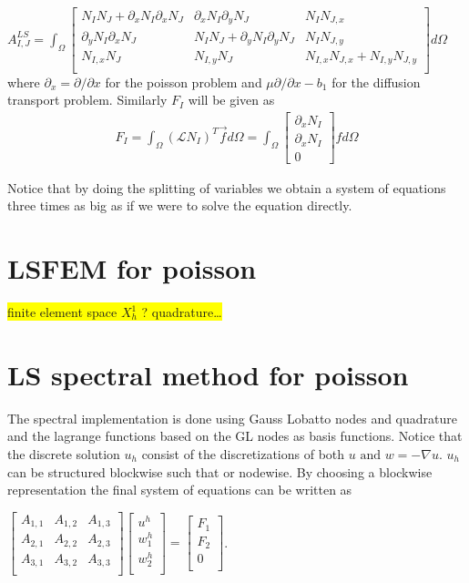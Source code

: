 $
A^{LS}_{I,J} = \int_{\Omega}
\begin{bmatrix}
	N_IN_J + \partial_x N_{I} \partial_xN_{J} & \partial_x N_{I}\partial_y N_{J} & N_IN_{J,x} \\ 	
	\partial_yN_{I}\partial_xN_{J} &N_IN_J + \partial_yN_{I}\partial_yN_{J} &  N_IN_{J,y} \\ 	
	N_{I,x}N_J & N_{I,y}N_J & N_{I,x}N_{J,x} + N_{I,y}N_{J,y} \\ 	
	\label{mat:basicPoisson}
\end{bmatrix}
d\Omega
$
where $\partial_x = \partial / \partial x $ for the poisson problem and $\mu \partial / \partial x - b_1$ for the diffusion transport problem. Similarly $F_I$ will be given as 
\begin{align}
	F_I = \int_{\Omega}(\mathcal{L}N_I)^T\vec{f} d\Omega = 
	\int_{\Omega}
\begin{bmatrix}
	\partial_xN_I \\
	\partial_xN_I \\
	0
\end{bmatrix}
	f d\Omega
	\label{eq:rhsFunctional}
\end{align}

Notice that by doing the splitting of variables we obtain a system of equations three times as big as if we were to solve the equation directly. 

\section{LSFEM for poisson}
\colorbox{yellow}{finite element space $X_h^1$ ? quadrature\ldots  }
\section{LS spectral method for poisson}

The spectral implementation is done using Gauss Lobatto nodes and quadrature and the lagrange functions based on the GL nodes as basis functions. 
Notice that the discrete solution $u_h$ consist of the discretizations of both $u \text{ and } w = - \nabla u$. $u_h$ can be structured blockwise such that or nodewise. By choosing a blockwise representation the final system of equations can be written as 

$
\begin{bmatrix}
	A_{1,1} & A_{1,2} &	A_{1,3} \\ 	
	A_{2,1} & A_{2,2} & A_{2,3} \\ 	
	A_{3,1} & A_{3,2} & A_{3,3} \\ 	
\end{bmatrix}
\begin{bmatrix}
 u^h \\ 	
 w^h_1\\ 	
 w^h_2\\ 	
\end{bmatrix}
=
\begin{bmatrix}
 F_1 \\ 	
 F_2\\ 	
 0 \\ 	
\end{bmatrix}
$.

